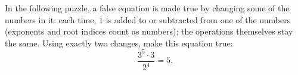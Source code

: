 In the following puzzle, a false equation is made true by changing some of the numbers in it: each time, $1$ is added to or subtracted from one of the numbers (exponents and root indices count as numbers); the operations themselves stay the same. Using exactly two changes, make this equation true:
\[\dfrac{3^5\cdot3}{2^4}=5.\]
